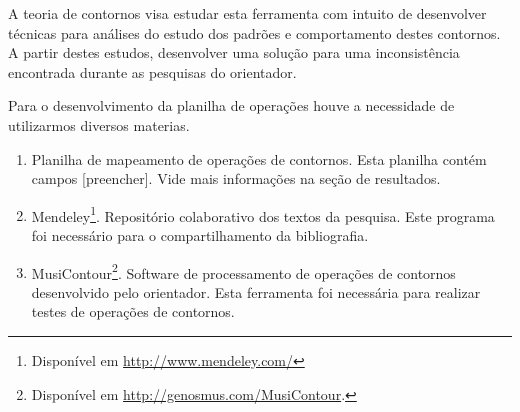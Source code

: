\documentclass[11pt]{article}
\begin{document}
A teoria de contornos visa estudar esta ferramenta com intuito de
desenvolver técnicas para análises do estudo dos padrões e
comportamento destes contornos.
A partir destes estudos, desenvolver uma solução para uma
inconsistência encontrada durante as pesquisas do orientador.


\label{sec:materiais}

Para o desenvolvimento da planilha de operações houve a necessidade de
utilizarmos diversos materias.


\begin{enumerate}
\item Planilha de mapeamento de operações de contornos. Esta planilha
  contém campos [preencher]. Vide mais informações na seção de
  resultados.
\item Mendeley\footnote{Disponível em
    \url{http://www.mendeley.com/}}. Repositório colaborativo dos
  textos da pesquisa. Este programa foi necessário para o
  compartilhamento da bibliografia.
\item MusiContour\footnote{Disponível em
    \url{http://genosmus.com/MusiContour}.}. Software de processamento
  de operações de contornos desenvolvido pelo orientador. Esta
  ferramenta foi necessária para realizar testes de operações de
  contornos.
\end{enumerate}
\end{document}

